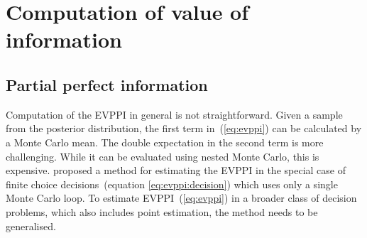 \documentclass[12pt]{article}\usepackage[]{graphicx}\usepackage[]{color}
\begin{document}
\section{Computation of value of information}
\label{sec:comp}

\subsection{Partial perfect information}
\label{sec:evppi:comp}

Computation of the EVPPI in general is not straightforward.  Given a sample from the posterior distribution, the first term in~(\ref{eq:evppi}) can be calculated by a Monte Carlo mean.  The double expectation in the second term is more challenging.  While it can be evaluated using nested Monte Carlo, this is expensive.   \citet{strong:oakley:multievppi} proposed a method for estimating the EVPPI in the special case of finite choice decisions~(equation \ref{eq:evppi:decision}) which uses only a single Monte Carlo loop.   To estimate EVPPI~(\ref{eq:evppi}) in a broader class of decision problems, which also includes point estimation, the method needs to be generalised.
\end{document}

